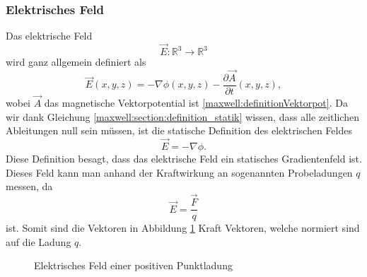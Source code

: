 \subsubsection{Elektrisches Feld}
Das elektrische Feld
\[
\vec{E}:\mathbb{R}^3 \rightarrow \mathbb{R}^3
\]
wird ganz allgemein definiert als
\begin{equation}
\vec{E}(x,y,z)
=
- \nabla\phi(x,y,z) - \frac{\partial \vec{A}}{\partial t}(x,y,z),
\label{maxwell:section:definiton_allgemein_elektrischesFeld}
\end{equation}
wobei $\vec{A}$ das magnetische Vektorpotential ist \eqref{maxwell:definitionVektorpot}.
Da wir dank Gleichung \eqref{maxwell:section:definition_statik} wissen, dass alle zeitlichen Ableitungen null sein müssen, ist die statische Definition des elektrischen Feldes
\begin{equation}
\vec{E}
=
- \nabla\phi.
\label{maxwell:section:definition_statisch_elektrischesFeld}
\end{equation}
Diese Definition besagt, dass das elektrische Feld ein statisches Gradientenfeld ist.
Dieses Feld kann man anhand der Kraftwirkung an sogenannten Probeladungen $q$ messen, da
\[
\vec{E}
=
\frac{\vec{F}}{q}
\]
ist.
Somit sind die Vektoren in Abbildung \ref{maxwell:section:E-Feld_punktladung} Kraft Vektoren, welche normiert sind auf die Ladung $q$.
\begin{figure}
	\centering
	\caption{Elektrisches Feld einer positiven Punktladung}
	\label{maxwell:section:E-Feld_punktladung}
\end{figure}

